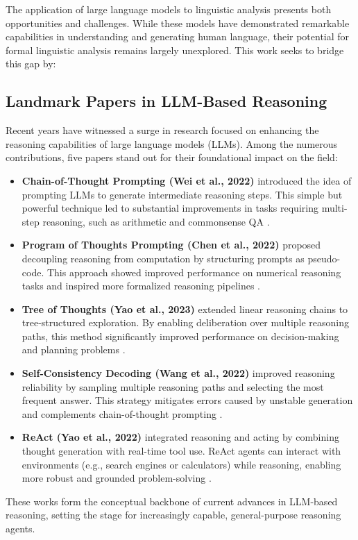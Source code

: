 The application of large language models to linguistic analysis presents both opportunities and challenges. While these models have demonstrated remarkable capabilities in understanding and generating human language, their potential for formal linguistic analysis remains largely unexplored. This work seeks to bridge this gap by:
\subsection{Landmark Papers in LLM-Based Reasoning}

Recent years have witnessed a surge in research focused on enhancing the reasoning capabilities of large language models (LLMs). Among the numerous contributions, five papers stand out for their foundational impact on the field:

\begin{itemize}
    \item \textbf{Chain-of-Thought Prompting (Wei et al., 2022)} introduced the idea of prompting LLMs to generate intermediate reasoning steps. This simple but powerful technique led to substantial improvements in tasks requiring multi-step reasoning, such as arithmetic and commonsense QA \cite{wei2022chain}.

    \item \textbf{Program of Thoughts Prompting (Chen et al., 2022)} proposed decoupling reasoning from computation by structuring prompts as pseudo-code. This approach showed improved performance on numerical reasoning tasks and inspired more formalized reasoning pipelines \cite{chen2022program}.

    \item \textbf{Tree of Thoughts (Yao et al., 2023)} extended linear reasoning chains to tree-structured exploration. By enabling deliberation over multiple reasoning paths, this method significantly improved performance on decision-making and planning problems \cite{yao2023tree}.

    \item \textbf{Self-Consistency Decoding (Wang et al., 2022)} improved reasoning reliability by sampling multiple reasoning paths and selecting the most frequent answer. This strategy mitigates errors caused by unstable generation and complements chain-of-thought prompting \cite{wang2022self}.

    \item \textbf{ReAct (Yao et al., 2022)} integrated reasoning and acting by combining thought generation with real-time tool use. ReAct agents can interact with environments (e.g., search engines or calculators) while reasoning, enabling more robust and grounded problem-solving \cite{yao2022react}.
\end{itemize}

These works form the conceptual backbone of current advances in LLM-based reasoning, setting the stage for increasingly capable, general-purpose reasoning agents.

